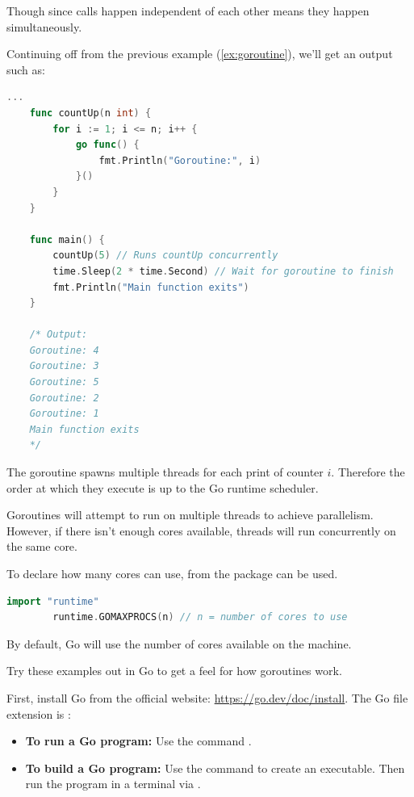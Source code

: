 \noindent
Though since calls happen independent of each other means they happen simultaneously.
\begin{Example}

    \label{ex:goroutine_corollary}
    Continuing off from the previous example (\ref{ex:goroutine}), we'll get an output such as:
    \begin{lstlisting}[language=Go, caption=Output of Goroutine Example, label={lst:output}, numbers=none]
    ...
    func countUp(n int) {
        for i := 1; i <= n; i++ {
            go func() {
                fmt.Println("Goroutine:", i)
            }()
        }
    }

    func main() {
        countUp(5) // Runs countUp concurrently
        time.Sleep(2 * time.Second) // Wait for goroutine to finish
        fmt.Println("Main function exits")
    }

    /* Output:
    Goroutine: 4
    Goroutine: 3
    Goroutine: 5
    Goroutine: 2
    Goroutine: 1
    Main function exits
    */
    \end{lstlisting}
    \noindent
    The goroutine spawns multiple threads for each print of counter $i$. Therefore the order at which they execute is 
    up to the Go runtime scheduler.
\end{Example}

\begin{theo}

    Goroutines will attempt to run on multiple threads to achieve parallelism. However, if there isn't enough cores available, 
    threads will run concurrently on the same core.

    To declare how many cores can use,  from the  package can be used.
    \begin{lstlisting}[language=Go, caption=Setting the Number of Cores for Goroutines, label={lst:cores}]
        import "runtime"
        runtime.GOMAXPROCS(n) // n = number of cores to use
    \end{lstlisting}
    \noindent
    By default, Go will use the number of cores available on the machine.
\end{theo}

\newpage 

\noindent
Try these examples out in Go to get a feel for how goroutines work.

\begin{Def}

    First, install Go from the official website: \href{https://go.dev/doc/install}{https://go.dev/doc/install}.
    The Go file extension is :
    \begin{itemize}
        \item \textbf{To run a Go program:} Use the command .
        \item \textbf{To build a Go program:} Use the command  to create an executable.
        Then run the program in a terminal via .
    \end{itemize}
\end{Def}

